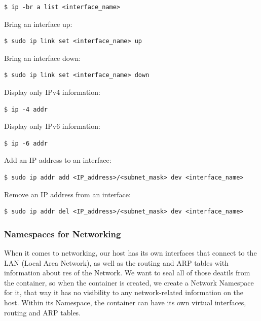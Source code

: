 \documentclass{article}
\newenvironment{codetemplate}[1][]{%
  \mybasecolorbox[#1]
  \itshape
}{%
  \endmybasecolorbox
}
\begin{document}
\begin{codetemplate}{}
\begin{verbatim}
$ ip -br a list <interface_name>
\end{verbatim}
\end{codetemplate}

Bring an interface up:
\begin{codetemplate}{}
\begin{verbatim}
$ sudo ip link set <interface_name> up
\end{verbatim}
\end{codetemplate}

Bring an interface down:
\begin{codetemplate}{}
\begin{verbatim}
$ sudo ip link set <interface_name> down
\end{verbatim}
\end{codetemplate}

Display only IPv4 information:
\begin{codetemplate}{}
\begin{verbatim}
$ ip -4 addr
\end{verbatim}
\end{codetemplate}

Display only IPv6 information:
\begin{codetemplate}{}
\begin{verbatim}
$ ip -6 addr
\end{verbatim}
\end{codetemplate}

Add an IP address to an interface:
\begin{codetemplate}{}
\begin{verbatim}
$ sudo ip addr add <IP_address>/<subnet_mask> dev <interface_name>
\end{verbatim}
\end{codetemplate}

Remove an IP address from an interface:
\begin{codetemplate}{}
\begin{verbatim}
$ sudo ip addr del <IP_address>/<subnet_mask> dev <interface_name>
\end{verbatim}
\end{codetemplate}

\subsubsection{Namespaces for Networking}
When it comes to networking, our host has its own interfaces that connect to the LAN (Local Area Network), as well as the routing and ARP tables with information about res of the Network. We want to seal all of those deatils from the container, so when the container is created, we create a Network Namespace for it, that way it has no visibility to any network-related information on the host. Within its Namespace, the container can have its own virtual interfaces, routing and ARP tables.
\end{document}
